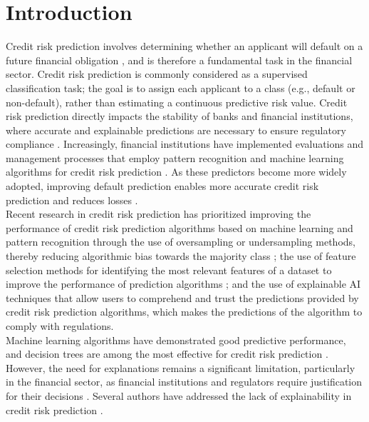 \section{Introduction}\label{sec:introduction}
    Credit risk prediction involves determining whether an applicant will default on a future financial obligation \cite{zhu2025hybrid}, and is therefore a fundamental task in the financial sector. %
    Credit risk prediction is commonly considered as a supervised classification task; the goal is to assign each applicant to a class (e.g., default or non-default), rather than estimating a continuous predictive risk value. Credit risk prediction directly impacts the stability of banks and financial institutions, where accurate and explainable predictions are necessary to ensure regulatory compliance \cite{zhao2024improved, nguyen2025comparative}. Increasingly, financial institutions have implemented evaluations and management processes that employ pattern recognition and machine learning algorithms for credit risk prediction \cite{weber2024applications, yeo2025comprehensive}. As these predictors become more widely adopted, improving default prediction enables more accurate credit risk prediction and reduces losses \cite{lu2025llm, hartomo2025novel, yu2025hybrid}.\\

    Recent research in credit risk prediction has prioritized improving the performance of credit risk prediction algorithms based on machine learning and pattern recognition through the use of oversampling or undersampling methods, thereby reducing algorithmic bias towards the majority class \cite{adiputra2025effectiveness, ali2025explainable, kandi2025enhancing, darwish2025intelligent, hu2025combining}; the use of feature selection methods for identifying the most relevant features of a dataset to improve the performance of prediction algorithms \cite{zhu2025hybrid, gasmi2025features, zou2025variable, wang2024feature}; and the use of explainable AI techniques \cite{ali2025explainable, lin2025credit, zhang2025method, han2024nate} that allow users to comprehend and trust the predictions provided by credit risk prediction algorithms, which makes the predictions of the algorithm to comply with regulations.\\
        
    Machine learning algorithms have demonstrated good predictive performance, and decision trees are among the most effective for credit risk prediction \cite{weber2024applications, chang2024prediction, aruleba2024effective, zhang2025blockchain, xia2025confidence, wu2024credit, zou2025interpretable}. However, the need for explanations remains a significant limitation, particularly in the financial sector, as financial institutions and regulators require justification for their decisions \cite{sowmiya2024credit, ravi2025explainable}. Several authors have addressed the lack of explainability in credit risk prediction \cite{lin2025credit, zandi2025attention,sun2025enhancing}. \newline
    
